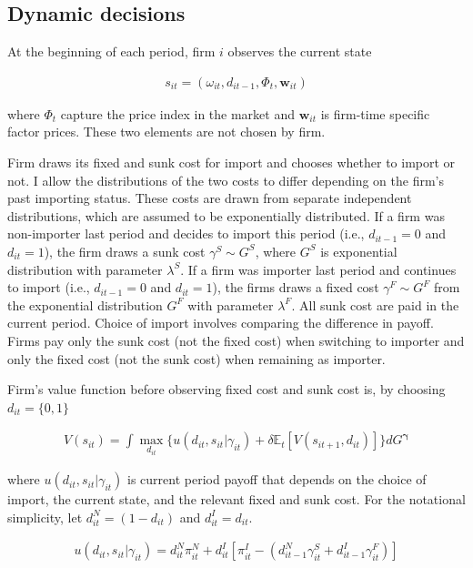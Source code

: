 \documentclass[11pt,letter]{article}
\newcommand{\vect}[1]{\boldsymbol{\mathbf{#1}}}
\newcounter{lem}[section] \setcounter{lem}{0}
\newcommand{\mprn}[1]{\{{#1}\}}
\newcommand{\Lmprn}[1]{\Big\{{#1}\Big\}}
\newcommand{\lprn}[1]{\left[{#1}\right]}
\begin{document}
\begin{appendices}
\subsection{Dynamic decisions}

At the beginning of each period, firm $i$ observes the current state

\begin{align}
s_{it} = (\omega_{it},d_{it-1},\Phi_{t},\vect{w}_{it})
\end{align}

\noindent where $\Phi_{t}$ capture the price index in the market and $\vect{w}_{it}$ is firm-time specific factor prices. These two elements are not chosen by firm. 

Firm draws its fixed and sunk cost for import and chooses whether to import or not. I allow the distributions of the two costs to differ depending on the firm's  past importing status. These costs are drawn from separate independent distributions, which are assumed to be exponentially distributed. If a firm was non-importer last period and decides to import this period (i.e., $d_{it-1}=0$ and $d_{it}=1$), the firm draws a sunk cost $\gamma^S\sim G^S$, where $G^S$ is exponential distribution with parameter $\lambda^S$. If a firm was importer last period and continues to import (i.e., $d_{it-1}=0$ and $d_{it}=1$), the firms draws a fixed cost $\gamma^F\sim G^F$ from the exponential distribution $G^F$ with parameter $\lambda^F$. All sunk cost are paid in the current period. Choice of import involves comparing the difference in payoff. Firms pay only the sunk cost (not the fixed cost) when switching to importer and only the fixed cost (not the sunk cost) when remaining as importer.

Firm's value function before observing fixed cost and sunk cost is, by choosing $d_{it}=\mprn{0,1}$

\begin{align}
V(s_{it}) = \int \max_{d_{it}} \Lmprn{u(d_{it},s_{it}|\gamma_{it}) +\delta \mathbb{E}_t \lprn{V(s_{it+1},d_{it})}} dG^{\vect{\gamma}}
\end{align}

\noindent where $u(d_{it},s_{it}|\gamma_{it})$ is current period payoff that depends on the choice of import, the current state, and the relevant fixed and sunk cost. For the notational simplicity, let $d_{it}^N=(1-d_{it})$ and $d_{it}^I=d_{it}$.%

\begin{align}
u(d_{it},s_{it}|\gamma_{it}) = d_{it}^N \pi_{it}^N + d_{it}^I \lprn{\pi_{it}^I - (d_{it-1}^N\gamma^S_{it} + d_{it-1}^I\gamma_{it}^F)}
\end{align}


\end{appendices}
\end{document}

